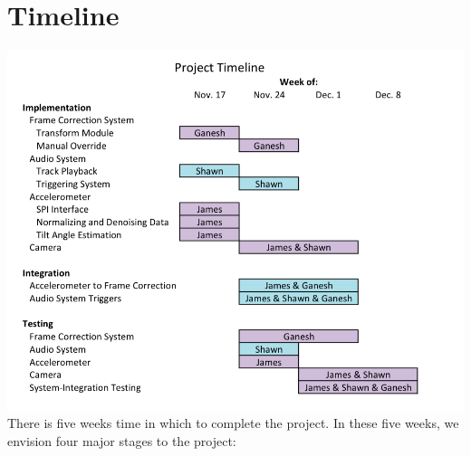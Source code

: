 \documentclass{article}
\begin{document}
\section{Timeline}
\includegraphics[width=\textwidth]{img/Timeline}
There is five weeks time in which to complete the project. In these five weeks, we envision four major stages to the project:
\end{document}
